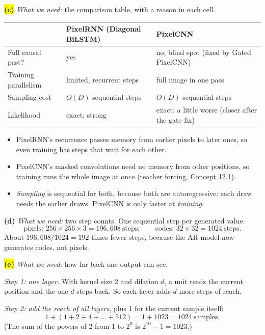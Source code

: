 \documentclass[12pt,a4paper]{article}
\begin{document}
\colorbox{yellow}{\textbf{(c)}} \emph{What we need:} the comparison table, with a reason in each cell.
\begin{center}
\begin{tabular}{@{}>{\raggedright\arraybackslash}p{}>{\raggedright\arraybackslash}p{}>{\raggedright\arraybackslash}p{}@{}}
\toprule
 & PixelRNN (Diagonal BiLSTM) & PixelCNN \\
\midrule
Full causal past? & yes & no, blind spot (fixed by Gated PixelCNN) \\
Training parallelism & limited, recurrent steps & full image in one pass \\
Sampling cost & $O(D)$ sequential steps & $O(D)$ sequential steps \\
Likelihood & exact; strong & exact; a little worse (closer after the gate fix) \\
\bottomrule
\end{tabular}
\end{center}
\begin{itemize}[nosep]
  \item PixelRNN's recurrence passes memory from earlier pixels to later ones, so even training has steps that wait for each other.
  \item PixelCNN's masked convolutions need no memory from other positions, so training runs the whole image at once (teacher forcing, \hyperref[c12-1]{Concept 12.1}).
  \item \emph{Sampling} is sequential for both, because both are autoregressive: each draw needs the earlier draws. PixelCNN is only faster at \emph{training}.
\end{itemize}

\textbf{(d)} \emph{What we need:} two step counts. One sequential step per generated value.
\[
\text{pixels: }256\times256\times3=196{,}608\ \text{steps};\qquad \text{codes: }32\times32=1024\ \text{steps}.
\]
About $196{,}608/1024=192$ times fewer steps, because the AR model now generates codes, not pixels.

\colorbox{yellow}{\textbf{(e)}} \emph{What we need:} how far back one output can see.

\emph{Step 1: one layer.} With kernel size 2 and dilation $d$, a unit reads the current position and the one $d$ steps back. So each layer adds $d$ more steps of reach.

\emph{Step 2: add the reach of all layers}, plus 1 for the current sample itself:
\[
1+(1+2+4+\dots+512)=1+1023=1024\ \text{samples}.
\]
(The sum of the powers of 2 from $1$ to $2^9$ is $2^{10}-1=1023$.)
\end{document}
